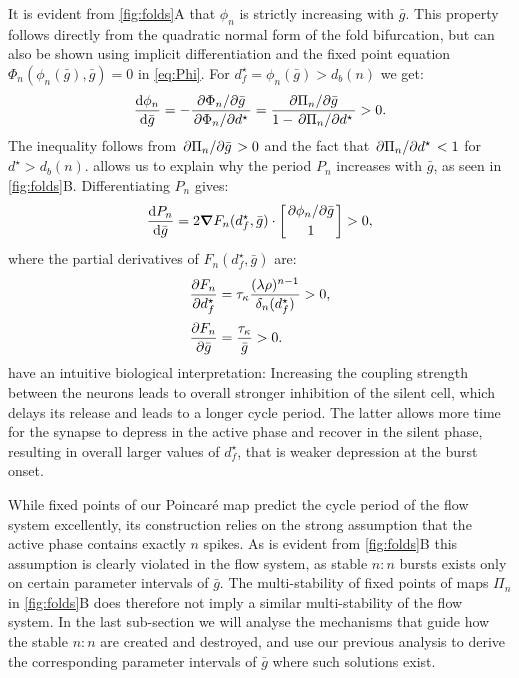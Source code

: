 \documentclass[utf8]{frontiersFPHY} %
\newcommand{\dn}{\delta_n}
\begin{document}
It is evident from \cref{fig:folds}A that $\phi_n$ is strictly increasing with $\bar g$.
This property follows directly from the quadratic normal form of the fold bifurcation, but can also be shown using implicit differentiation and the fixed point equation $\Phi_n(\phi_n(\bar g), \bar g)=0$ in \cref{eq:Phi}.
For $d^\star_f=\phi_n(\bar g)>d_b(n)$ we get:
\begin{equation}
	\label{eq:dstardg}
	\dv{\phi_n}{\bar g} = -\frac{\pdv*{\Phi_n}{\bar g}}{\pdv*{\Phi_n}{d^\star}} =
	\frac{\pdv*{\Pi_n}{\bar g}}{1-\pdv*{\Pi_n}{d^\star}}>0.
\end{equation}
The inequality follows from $\pdv*{\Pi_n}{\bar g}>0$ and the fact that $\pdv*{\Pi_n}{d^\star}<1$ for $d^\star>d_b(n)$.
 allows us to explain why the period $P_n$ increases with $\bar g$, as seen in \cref{fig:folds}B.
Differentiating $P_n$ gives:
\begin{equation}
	\label{eq:dPdg}
	\dv{P_{n}}{\bar g} = 2\grad F_n(d^\star_f, \bar g) \cdot
	\begin{bmatrix}\pdv*{\phi_n}{\bar g}\\[0.5ex] 1\end{bmatrix}>0,
\end{equation}
where the partial derivatives of $F_n(d^\star_f, \bar g)$ are:
\begin{align}
	\pdv{F_n}{d^\star_f} & = \tau_{\kappa} \frac{(\lambda\rho)^{n-1}}{\dn(d^\star_f)}>0, \\[0.5ex]
	\pdv{F_n}{\bar g}    & = \frac{\tau_{\kappa}}{\bar g}>0.
\end{align}
 have an intuitive biological interpretation: Increasing the coupling strength between the neurons leads to overall stronger inhibition of the silent cell, which delays its release and leads to a longer cycle period.
The latter allows more time for the synapse to depress in the active phase and recover in the silent phase, resulting in overall larger values of $d^\star_f$, that is weaker depression at the burst onset.

While fixed points of our Poincaré map predict the cycle period of the flow system excellently, its construction relies on the strong assumption that the active phase contains exactly $n$ spikes.
As is evident from \cref{fig:folds}B this assumption is clearly violated in the flow system, as stable $n:n$ bursts exists only on certain parameter intervals of $\bar g$.
The multi-stability of fixed points of maps $\Pi_{n}$ in \cref{fig:folds}B does therefore not imply a similar multi-stability of the flow system.
In the last sub-section we will analyse the mechanisms that guide how the stable $n:n$ are created and destroyed, and use our previous analysis to derive the corresponding parameter intervals of $\bar g$ where such solutions exist.
\end{document}

